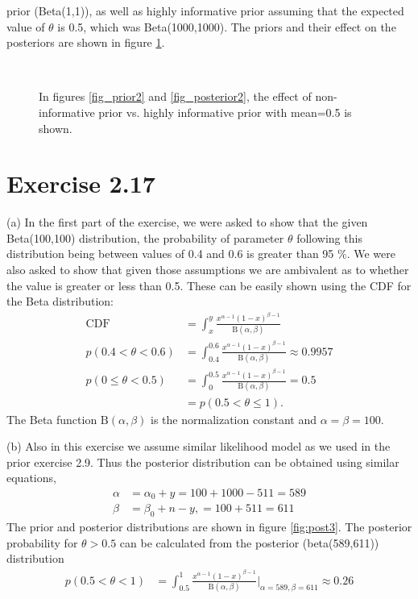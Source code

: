 \documentclass[a4paper]{article}
\begin{document}
prior (Beta(1,1)), as well as highly informative prior assuming that the
expected value of $\theta$ is 0.5, which was Beta(1000,1000). The priors and
their effect on the posteriors are shown in figure \ref{fig:priors2}.
\begin{figure}[ht]
  \begin{center}
    ~
    \caption{    %
      In figures \ref{fig_prior2} and \ref{fig_posterior2}, the effect of
non-informative prior vs. highly informative prior with mean=0.5 is
shown.}\label{fig:priors2}   
 \end{center}
\end{figure}
\clearpage
\section*{Exercise 2.17}
(a) In the first part of the exercise, we were asked to show that the
given Beta(100,100) distribution, the probability of parameter $\theta$
following this distribution being between values of 0.4 and 0.6 is greater
than 95 \%. We were also asked to show that given those assumptions we are
ambivalent as to whether the value is greater or less than 0.5. These can be
easily shown using the CDF for the Beta distribution:
\begin{align*}
    \mathrm{CDF} &=
\int_x^y\frac{x^{\alpha-1}(1-x)^{\beta-1}}{\mathrm{B}(\alpha,\beta)}\\
p(0.4<\theta<0.6) &= 
\int_{0.4}^{0.6}\frac{x^{\alpha-1}(1-x)^{\beta-1}}{\mathrm{B}(\alpha,\beta)}\approx0.9957\\
p(0\leq\theta<0.5) &= 
\int_{0}^{0.5}\frac{x^{\alpha-1}(1-x)^{\beta-1}}{\mathrm{B}(\alpha,\beta)}=0.5\\
&= p(0.5<\theta\leq1).
\end{align*}
The Beta function $\mathrm{B}(\alpha,\beta)$ is the normalization constant
and $\alpha=\beta=100$.

(b) Also in this exercise we assume similar likelihood model as we used in
the prior exercise 2.9. Thus the posterior distribution can be obtained using
similar equations,
\begin{align*}
    \alpha &= \alpha_0 + y = 100 + 1000 - 511 = 589\\
    \beta &= \beta_0 + n -y, = 100 + 511 = 611
\end{align*}
The prior and posterior distributions are shown in figure \ref{fig:post3}.
The posterior probability for $\theta>0.5$ can be calculated from the
posterior (beta(589,611)) distribution
\begin{align*}
p(0.5<\theta<1) &= 
\int_{0.5}^{1}\frac{x^{\alpha-1}(1-x)^{\beta-1}}{\mathrm{B}(\alpha,\beta)}\bigg|_{\alpha=589,\beta=611}
\approx0.26\\
\end{align*}
\end{document}
